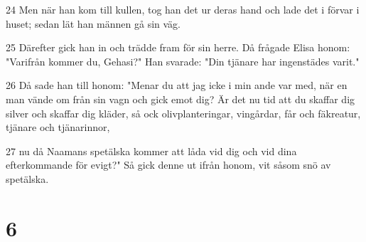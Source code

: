 \par 24 Men när han kom till kullen, tog han det ur deras hand och lade det i förvar i huset; sedan lät han männen gå sin väg.
\par 25 Därefter gick han in och trädde fram för sin herre. Då frågade Elisa honom: "Varifrån kommer du, Gehasi?" Han svarade: "Din tjänare har ingenstädes varit."
\par 26 Då sade han till honom: "Menar du att jag icke i min ande var med, när en man vände om från sin vagn och gick emot dig? Är det nu tid att du skaffar dig silver och skaffar dig kläder, så ock olivplanteringar, vingårdar, får och fäkreatur, tjänare och tjänarinnor,
\par 27 nu då Naamans spetälska kommer att låda vid dig och vid dina efterkommande för evigt?" Så gick denne ut ifrån honom, vit såsom snö av spetälska.

\chapter{6}

